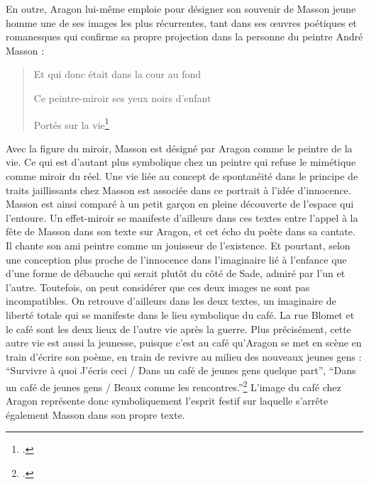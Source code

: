 	En outre, Aragon lui-même emploie pour désigner son souvenir de Masson jeune homme une de ses images les plus récurrentes, tant dans ses \oe{}uvres poétiques et romanesques qui confirme sa propre projection dans la personne du peintre André Masson : 

\begin{verse}
    
Et qui donc était dans la cour au fond

Ce peintre-miroir ses yeux noirs d’enfant

Portés sur la vie\footcite[p682]{ecritssurla}\end{verse}

	Avec la figure du miroir, Masson est désigné par Aragon comme le peintre de la vie. Ce qui est d’autant plus symbolique chez un peintre qui refuse le mimétique comme miroir du réel. Une vie  liée au concept de spontanéité dans le principe de traits jaillissants chez Masson est associée dans ce portrait à l’idée d’innocence. Masson est ainsi comparé à un petit garçon en pleine découverte de l’espace qui l’entoure. Un effet-miroir se manifeste d’ailleurs dans ces textes entre l’appel à la fête de Masson dans son texte sur Aragon, et cet écho du poète dans sa cantate. Il chante son ami peintre comme un jouisseur de l’existence. Et pourtant, selon une conception plus proche de l’innocence dans l’imaginaire lié à l’enfance que d’une forme de débauche qui serait plutôt du côté de Sade, admiré par l’un et l’autre. Toutefois, on peut considérer que ces deux images ne sont pas incompatibles. On retrouve d’ailleurs dans les deux textes, un imaginaire de liberté totale qui se manifeste dans le lieu symbolique du café. La rue Blomet et le café sont les deux lieux de l’autre vie après la guerre. Plus précisément, cette autre vie est aussi la jeunesse, puisque c’est au café qu’Aragon se met en scène en train d’écrire son poème, en train de revivre au milieu des nouveaux jeunes gens : \enquote{Survivre à quoi J’écris ceci / Dans un café de jeunes gens quelque part}, \enquote{Dans un café de jeunes gens / Beaux comme les rencontres.}\footcite[p681]{ecritssurla} L’image du café chez Aragon représente donc symboliquement l’esprit festif sur laquelle s’arrête également Masson dans son propre texte. 


